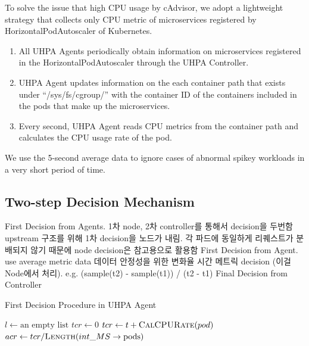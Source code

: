 \documentclass[conference]{IEEEtran}
\begin{document}
To solve the issue that high CPU usage by cAdvisor, we adopt a lightweight strategy that collects only CPU metric of microservices registered by HorizontalPodAutoscaler of Kubernetes.
\begin{enumerate}
    \item All UHPA Agents periodically obtain information on microservices registered in the HorizontalPodAutoscaler through the UHPA Controller.

    \item UHPA Agent updates information on the each container path that exists under “/sys/fs/cgroup/” with the container ID of the containers included in the pods that make up the microservices.

    \item Every second, UHPA Agent reads CPU metrics from the container path and calculates the CPU usage rate of the pod.
\end{enumerate}

We use the 5-second average data to ignore cases of abnormal spikey workloads in a very short period of time.

\subsection{Two-step Decision Mechanism}
First Decision from Agents.
1차 node, 2차 controller를 통해서 decision을 두번함 upstream 구조를 위해 1차 decision을 노드가 내림. 각 파드에 동일하게 리퀘스트가 분배되지 않기 때문에 node decision은 참고용으로 활용함
First Decision from Agent.
use average metric data
데이터 안정성을 위한 변화율 시간 메트릭 decision (이걸 Node에서 처리).
e.g. (sample(t2) - sample(t1)) / (t2 - t1)
Final Decision from Controller

\begin{algorithm}[ht!]
    \caption{First Decision Procedure in UHPA Agent}
    \begin{algorithmic}[1]
        \State $l \gets \text{an empty list}$
        \State $tcr \gets 0$
        \State $tcr \gets t + \Call{CalCPURate}{pod}$
        \EndFor
        \State $acr \gets tcr / \Call{Length}{int\_MS\rightarrow\text{pods}}$
        \State {}
        \EndIf
        \EndFor
        \State {}
        \EndIf
        \State {}
        \EndWhile
        \label{alg:agent}
    \end{algorithmic}
\end{algorithm}
\end{document}
